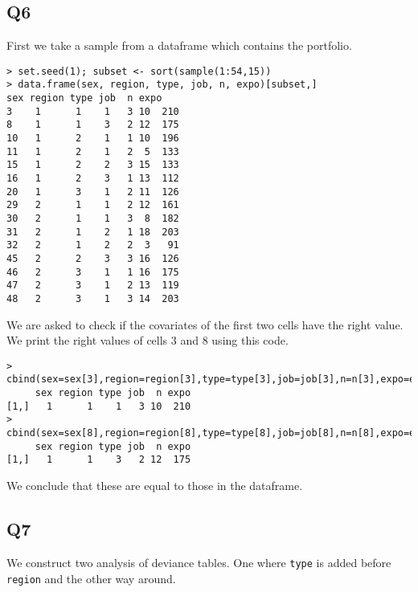 \documentclass[11pt]{article}
\begin{document}
\subsection*{Q6}

First we take a sample from a dataframe which contains the portfolio.

\begin{verbatim}
> set.seed(1); subset <- sort(sample(1:54,15))
> data.frame(sex, region, type, job, n, expo)[subset,]
sex region type job  n expo
3    1      1    1   3 10  210
8    1      1    3   2 12  175
10   1      2    1   1 10  196
11   1      2    1   2  5  133
15   1      2    2   3 15  133
16   1      2    3   1 13  112
20   1      3    1   2 11  126
29   2      1    1   2 12  161
30   2      1    1   3  8  182
31   2      1    2   1 18  203
32   2      1    2   2  3   91
45   2      2    3   3 16  126
46   2      3    1   1 16  175
47   2      3    1   2 13  119
48   2      3    1   3 14  203
\end{verbatim}

We are asked to check if the covariates of the first two cells have the right value. We print the right values of cells 3 and 8 using this code.

\begin{verbatim}
> cbind(sex=sex[3],region=region[3],type=type[3],job=job[3],n=n[3],expo=expo[3])
     sex region type job  n expo
[1,]   1      1    1   3 10  210
> cbind(sex=sex[8],region=region[8],type=type[8],job=job[8],n=n[8],expo=expo[8])
     sex region type job  n expo
[1,]   1      1    3   2 12  175
\end{verbatim}

We conclude that these are equal to those in the dataframe.

\subsection*{Q7}

We construct two analysis of deviance tables. One where \verb|type| is added before \verb|region| and the other way around.
\end{document}
